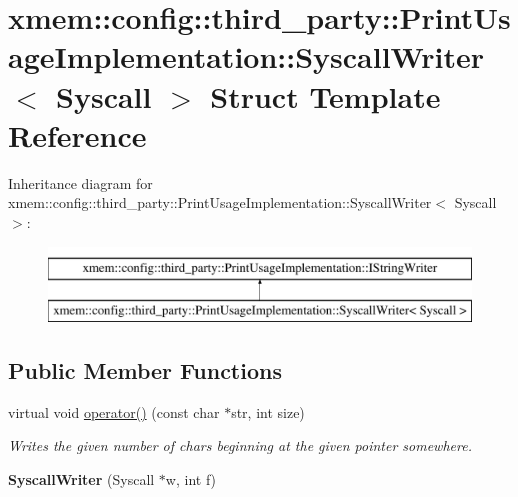 \hypertarget{structxmem_1_1config_1_1third__party_1_1_print_usage_implementation_1_1_syscall_writer}{\section{xmem\-:\-:config\-:\-:third\-\_\-party\-:\-:Print\-Usage\-Implementation\-:\-:Syscall\-Writer$<$ Syscall $>$ Struct Template Reference}
\label{structxmem_1_1config_1_1third__party_1_1_print_usage_implementation_1_1_syscall_writer}
}
Inheritance diagram for xmem\-:\-:config\-:\-:third\-\_\-party\-:\-:Print\-Usage\-Implementation\-:\-:Syscall\-Writer$<$ Syscall $>$\-:\begin{figure}[H]
\begin{center}
\leavevmode
\includegraphics[height=2.000000cm]{structxmem_1_1config_1_1third__party_1_1_print_usage_implementation_1_1_syscall_writer}
\end{center}
\end{figure}
\subsection*{Public Member Functions}
\begin{DoxyCompactItemize}
\item 
\hypertarget{structxmem_1_1config_1_1third__party_1_1_print_usage_implementation_1_1_syscall_writer_abe35fdd4b67e221c5d6a3972a4970fb3}{virtual void \hyperlink{structxmem_1_1config_1_1third__party_1_1_print_usage_implementation_1_1_syscall_writer_abe35fdd4b67e221c5d6a3972a4970fb3}{operator()} (const char $\ast$str, int size)}\label{structxmem_1_1config_1_1third__party_1_1_print_usage_implementation_1_1_syscall_writer_abe35fdd4b67e221c5d6a3972a4970fb3}

\begin{DoxyCompactList}\small\item\em Writes the given number of chars beginning at the given pointer somewhere. \end{DoxyCompactList}\item 
\hypertarget{structxmem_1_1config_1_1third__party_1_1_print_usage_implementation_1_1_syscall_writer_a0787970dd79c70174d96b4ac9a05cacd}{{\bfseries Syscall\-Writer} (Syscall $\ast$w, int f)}\label{structxmem_1_1config_1_1third__party_1_1_print_usage_implementation_1_1_syscall_writer_a0787970dd79c70174d96b4ac9a05cacd}

\end{DoxyCompactItemize}
